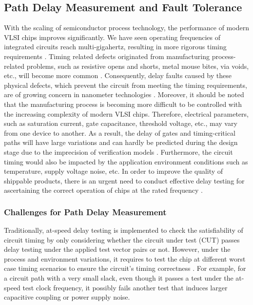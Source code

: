 \subsection{Path Delay Measurement and Fault Tolerance}
    With the scaling of semiconductor process technology, the performance of modern VLSI chips improves significantly. We have seen operating frequencies of integrated circuits reach multi-gigahertz, resulting in more rigorous timing requirements \cite{ITRS09} \cite{zeitzoff2002mosfet}. Timing related defects originated from manufacturing process-related problems, such as resistive opens and shorts, metal mouse bites, via voids, etc., will become more common \cite{hawkins2003view}. Consequently, delay faults caused by these physical defects, which prevent the circuit from meeting the timing requirements, are of growing concern in nanometer technologies \cite{krstic1998delay}. Moreover, it should be noted that the manufacturing process is becoming more difficult to be controlled with the increasing complexity of modern VLSI chips. Therefore, electrical parameters, such as saturation current, gate capacitance, threshold voltage, etc., may vary from one device to another. As a result, the delay of gates and timing-critical paths will have large variations and can hardly be predicted during the design stage due to the imprecision of verification models \cite{blaauw2008statistical} \cite{agarwal2003statistical}. Furthermore, the circuit timing would also be impacted by the application environment conditions such as temperature, supply voltage noise, etc. In order to improve the quality of shippable products, there is an urgent need to conduct effective delay testing for ascertaining the correct operation of chips at the rated frequency \cite{mak2004new} \cite{krstic1998delay}.

\subsubsection{Challenges for Path Delay Measurement}
Traditionally, at-speed delay testing is implemented to check the satisfiability of circuit timing by only considering whether the circuit under test (CUT) passes delay testing under the applied test vector pairs or not. However, under the process and environment variations, it requires to test the chip at different worst case timing scenarios to ensure the circuit’s timing correctness \cite{krstic2001delay} \cite{zhang2008multiple} \cite{fu2008robust}. For example, for a circuit path with a very small slack, even though it passes a test under the at-speed test clock frequency, it possibly fails another test that induces larger capacitive coupling or power supply noise.

